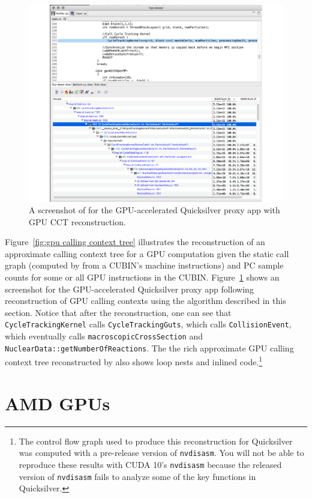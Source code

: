 \begin{figure}[t]
\centering
\includegraphics[width=\textwidth]{fig/qs-cct.pdf}
\caption{A screenshot of \hpcviewer{} for the GPU-accelerated Quicksilver proxy app with GPU CCT reconstruction.}
\label{qs-cct}
\end{figure}

Figure~\ref{fig:gpu calling context tree} illustrates the reconstruction of an approximate calling context tree for a GPU computation given the static call graph (computed by \hpcstruct{} from a CUBIN's machine instructions) and PC sample counts for some or all GPU instructions in the CUBIN. Figure~\ref{qs-cct} shows an \hpcviewer{} screenshot for the GPU-accelerated Quicksilver proxy app following reconstruction of GPU calling contexts using the algorithm described in this section. Notice that after the reconstruction, one can see that \verb|CycleTrackingKernel| calls \verb|CycleTrackingGuts|, which calls \verb|CollisionEvent|, which eventually calls  \verb|macroscopicCrossSection| and \verb|NuclearData::getNumberOfReactions|. The the rich  approximate GPU calling context tree reconstructed by \hpcprof{} also shows loop nests and inlined code.\footnote{The control flow graph used to produce this reconstruction for Quicksilver was computed with a pre-release version of {\tt nvdisasm}. You will not be able to reproduce these results with CUDA 10's {\tt nvdisasm} because the released version of {\tt nvdisasm} fails to analyze some of the key functions in Quicksilver.}



\section{AMD GPUs}

